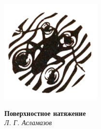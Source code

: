 \pagestyle{fancy}
\fancyhf{}
\pagecolor{Apricot}

\noindent\makebox[\linewidth]{\rule{21cm}{0.4pt}}
\begin{multicols}{3}
\begin{flushright}
\vspace*{\fill}
\includegraphics[scale=0.5]{title.png}
\vspace*{\fill}
\end{flushright}
\vspace*{\fill}
\begin{flushleft}
\Huge
\textbf{Поверхностное натяжение}\\
\Large
\textit{Л. Г. Асламазов}    
\end{flushleft}
\vspace*{\fill}
\end{multicols}
\noindent\makebox[\linewidth]{\rule{21cm}{0.4pt}}

